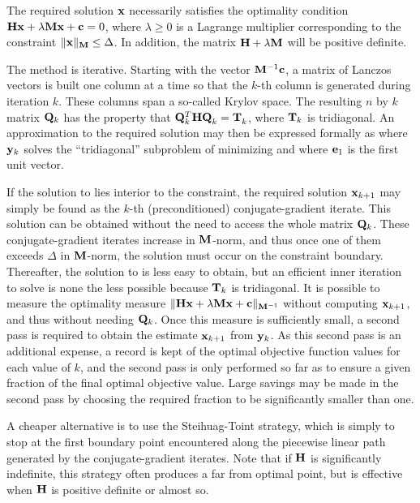 \documentclass{galahad}
\begin{document}

\galmethod
The required solution ${\mathbf{x}}$ necessarily satisfies the optimality condition
${\mathbf{H}} {\mathbf{x}} + \lambda {\mathbf{M}} {\mathbf{x}} + {\mathbf{c}} = 0$, where $\lambda \geq 0$
is a Lagrange
multiplier corresponding to the constraint $\|{\mathbf{x}}\|_{{\mathbf{M}}}  \leq  \Delta$.
In addition, the matrix ${\mathbf{H}} + \lambda {\mathbf{M}}$ will be positive definite.

\noindent
The method is iterative. Starting  with the vector ${\mathbf{M}}^{-1} {\mathbf{c}}$,
a matrix of Lanczos vectors is built one column at a time
so that the $k$-th column is generated during
iteration $k$. These columns span a so-called Krylov space.
The resulting $n$ by $k$ matrix ${\mathbf{Q}}_k $ has the
property that ${\mathbf{Q}}_{k}^T {\mathbf{H}} {\mathbf{Q}}_k^{}  =  {\mathbf{T}}_{k}^{}$,
where ${\mathbf{T}}_k$ is tridiagonal. An approximation to the
required solution may then be expressed formally as
where ${\mathbf{y}}_k $ solves the ``tridiagonal'' subproblem of minimizing
and where ${\mathbf{e}}_1$ is the first unit vector.

If the solution to  lies interior to the constraint, the required
solution ${\mathbf{x}}_{k+1}$ may simply be found as the $k$-th (preconditioned)
conjugate-gradient iterate. This solution can be obtained without the need to
access the whole matrix ${\mathbf{Q}}_k$.
These conjugate-gradient iterates increase in ${\mathbf{M}}$-norm, and
thus once one of them exceeds $\Delta$ in ${\mathbf{M}}$-norm, the solution must occur
on the constraint boundary. Thereafter, the solution to  is less
easy to obtain, but an efficient inner iteration to solve  is
none the less possible because ${\mathbf{T}}_k $ is tridiagonal.
It is possible to measure the optimality measure
$\|{\mathbf{H}} {\mathbf{x}}  +  \lambda {\mathbf{M}} {\mathbf{x}}  +  {\mathbf{c}}\|_{{\mathbf{M}}^{-1}}$
without computing ${\mathbf{x}}_{k+1}$, and thus without
needing ${\mathbf{Q}}_k $. Once this measure is sufficiently small, a second pass
is required to obtain the estimate ${\mathbf{x}}_{k+1} $ from ${\mathbf{y}}_k $.
As this second pass is an additional expense, a record is kept of the
optimal objective function values for each value of $k$, and the second
pass is only performed so far as to ensure a given fraction of the
final optimal objective value. Large savings may be made in the second
pass by choosing the required fraction to be significantly smaller than one.

A cheaper alternative is to use the Steihuag-Toint strategy, which is simply
to stop at the first boundary point encountered along the piecewise
linear path generated by the conjugate-gradient iterates. Note that if
${\mathbf{H}}$ is significantly indefinite, this strategy often produces a far from
optimal point, but is effective when ${\mathbf{H}}$ is positive definite or almost
so.
\end{document}
